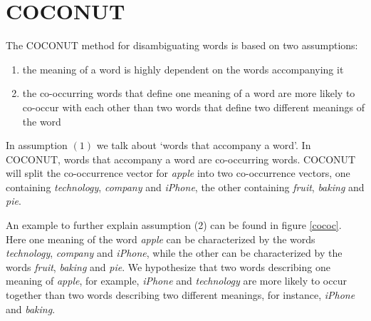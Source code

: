 \documentclass[11pt]{article}
\begin{document}
\section{COCONUT}
\label{anouk}
The COCONUT method for disambiguating words is based on two assumptions: 
\begin{enumerate}
\item the meaning of a word is highly dependent on the words accompanying it
\item the co-occurring words that define one meaning of a word are more likely to co-occur with each other than two words that define two different meanings of the word
\end{enumerate}
In assumption $(1)$ we talk about `words that accompany a word'. In COCONUT, words that accompany a word are co-occurring words. COCONUT will split the co-occurrence vector for \textit{apple} into two co-occurrence vectors, one containing \textit{technology}, \textit{company} and \textit{iPhone}, the other containing \textit{fruit}, \textit{baking} and \textit{pie}. 

An example to further explain assumption (2) can be found in figure \ref{cococ}. Here one meaning of the word \textit{apple} can be characterized by the words \textit{technology}, \textit{company} and \textit{iPhone}, while the other can be characterized by the words \textit{fruit}, \textit{baking} and \textit{pie}. We hypothesize that two words describing one meaning of \textit{apple}, for example, \textit{iPhone} and \textit{technology} are more likely to occur together than two words describing two different meanings, for instance, \textit{iPhone} and \textit{baking}.
\end{document}
